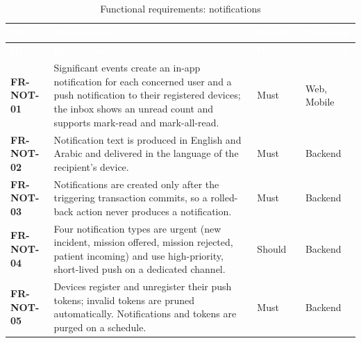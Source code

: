 {\tabfont\rowband
\begin{longtable}{@{}>{\raggedright\arraybackslash}p{}>{\raggedright\arraybackslash}p{}>{\raggedright\arraybackslash}p{}>{\raggedright\arraybackslash}p{}@{}}
\caption{Functional requirements: notifications}\label{tab:fr-not}\\
\rowcolor{najdanavy}\textcolor{white}{\sffamily\bfseries\small ID} & \textcolor{white}{\sffamily\bfseries\small Requirement} & \textcolor{white}{\sffamily\bfseries\small Priority} & \textcolor{white}{\sffamily\bfseries\small Platform}\\
\endfirsthead
\rowcolor{najdanavy}\textcolor{white}{\sffamily\bfseries\small ID} & \textcolor{white}{\sffamily\bfseries\small Requirement} & \textcolor{white}{\sffamily\bfseries\small Priority} & \textcolor{white}{\sffamily\bfseries\small Platform}\\
\endhead
\bottomrule\endlastfoot
\textbf{FR-NOT-01} & Significant events create an in-app notification for each concerned user and a push notification to their registered devices; the inbox shows an unread count and supports mark-read and mark-all-read. & Must & Web, Mobile\\
\textbf{FR-NOT-02} & Notification text is produced in English and Arabic and delivered in the language of the recipient’s device. & Must & Backend\\
\textbf{FR-NOT-03} & Notifications are created only after the triggering transaction commits, so a rolled-back action never produces a notification. & Must & Backend\\
\textbf{FR-NOT-04} & Four notification types are urgent (new incident, mission offered, mission rejected, patient incoming) and use high-priority, short-lived push on a dedicated channel. & Should & Backend\\
\textbf{FR-NOT-05} & Devices register and unregister their push tokens; invalid tokens are pruned automatically. Notifications and tokens are purged on a schedule. & Must & Backend\\
\end{longtable}}
